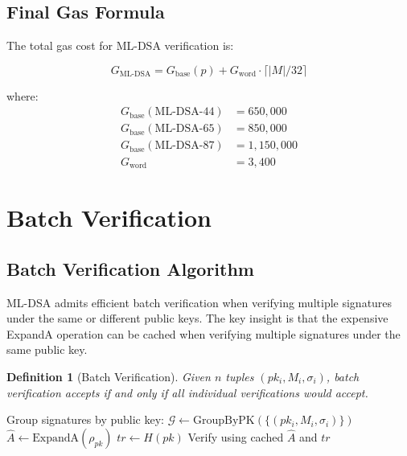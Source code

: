 \documentclass[11pt,a4paper]{article}
\newtheorem{definition}{Definition}
\begin{document}
\subsection{Final Gas Formula}

The total gas cost for ML-DSA verification is:

\begin{equation}
G_{\text{ML-DSA}} = G_{\text{base}}(p) + G_{\text{word}} \cdot \lceil |M| / 32 \rceil
\end{equation}

where:
\begin{align}
G_{\text{base}}(\text{ML-DSA-44}) &= 650,000 \\
G_{\text{base}}(\text{ML-DSA-65}) &= 850,000 \\
G_{\text{base}}(\text{ML-DSA-87}) &= 1,150,000 \\
G_{\text{word}} &= 3,400
\end{align}

\section{Batch Verification}

\subsection{Batch Verification Algorithm}

ML-DSA admits efficient batch verification when verifying multiple signatures under the same or different public keys. The key insight is that the expensive ExpandA operation can be cached when verifying multiple signatures under the same public key.

\begin{definition}[Batch Verification]
Given $n$ tuples $(pk_i, M_i, \sigma_i)$, batch verification accepts if and only if all individual verifications would accept.
\end{definition}

\begin{algorithm}
\caption{ML-DSA.BatchVerify$(\{(pk_i, M_i, \sigma_i)\}_{i=1}^n)$}
\label{alg:batch}
\begin{algorithmic}[1]
\State Group signatures by public key: $\mathcal{G} \gets \text{GroupByPK}(\{(pk_i, M_i, \sigma_i)\})$
    \State $\hat{A} \gets \text{ExpandA}(\rho_{pk})$ 
    \State $tr \gets H(pk)$ 
        \State Verify using cached $\hat{A}$ and $tr$
    \EndFor
\EndFor
\end{algorithmic}
\end{algorithm}
\end{document}
